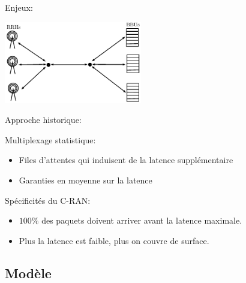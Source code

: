 \documentclass[10 pt]{beamer}
\begin{document}
\begin{frame}{Enjeux:}
  \centering
  
  \begin{center}
  \includegraphics [width=6cm]{modelstar} 
\end{center}

 \begin{multicols}{2}
Approche historique:

Multiplexage statistique:
\begin{itemize}
\item Files d'attentes qui induisent de la latence supplémentaire
\item Garanties en moyenne sur la latence
\end{itemize}
\vspace{2cm}

Spécificités du C-RAN:
 \begin{itemize}
\item $100\%$ des paquets doivent arriver avant la latence maximale.
\item Plus la latence est faible, plus on couvre de surface.
\end{itemize}

\end{multicols}

\end{frame}


\subsection{Modèle}
 
\end{document}
